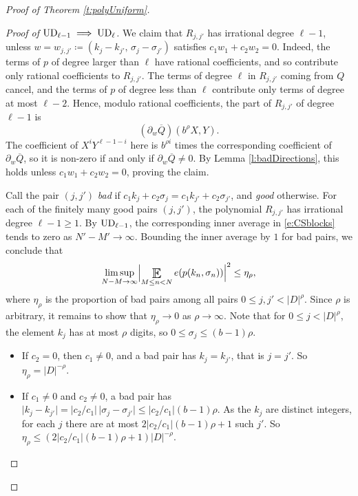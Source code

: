 \begin{proof}[Proof of Theorem \ref{t:polyUniform}]
\begin{proof}[Proof of $\textup{UD}_{\ell-1} \implies \textup{UD}_\ell$]
We claim that $R_{j,j'}$ has irrational degree $\ell-1$, unless $w=w_{j,j'}\coloneqq(k_j-k_{j'},\,\sigma_j-\sigma_{j'})$ satisfies $c_1w_1+c_2w_2=0$. 
Indeed, the terms of $p$ of degree larger than $\ell$ have rational coefficients, and so contribute only rational coefficients to $R_{j,j'}$. 
The terms of degree $\ell$ in $R_{j,j'}$ coming from $Q$ cancel, and the terms of $p$ of degree less than $\ell$ contribute only terms of degree at most $\ell-2$. 
Hence, modulo rational coefficients, the part of $R_{j,j'}$ of degree $\ell-1$ is 
\begin{equation}
(\partial_w\overline Q)(b^{\rho}X,Y). 
\end{equation}
The coefficient of $X^iY^{\ell-1-i}$ here is $b^{\rho i}$ times the corresponding coefficient of $\partial_w\overline Q$, so it is non-zero if and only if $\partial_w\overline Q\neq 0$. 
By Lemma \ref{l:badDirections}, this holds unless $c_1w_1+c_2w_2=0$, proving the claim. 

Call the pair $(j,j')$ \emph{bad} if $c_1k_j+c_2\sigma_j=c_1k_{j'}+c_2\sigma_{j'}$, and \emph{good} otherwise. 
For each of the finitely many good pairs $(j,j')$, the polynomial $R_{j,j'}$ has irrational degree $\ell-1\geq 1$. 
By $\textup{UD}_{\ell-1}$, the corresponding inner average in \eqref{e:CSblocks} tends to zero as $N'-M'\to\infty$. 
Bounding the inner average by $1$ for bad pairs, we conclude that 
\begin{equation}
\limsup_{N-M\to\infty}\Bigl\lvert \Expectation_{M\leq n<N}e(p(k_n,\sigma_n))\Bigr\rvert^2\leq \eta_\rho, 
\end{equation}
where $\eta_\rho$ is the proportion of bad pairs among all pairs $0\leq j,j'<\lvert D\rvert^{\rho}$. 
Since $\rho$ is arbitrary, it remains to show that $\eta_\rho\to0$ as $\rho\to\infty$. 
Note that for $0\leq j<\lvert D\rvert^{\rho}$, the element $k_j$ has at most $\rho$ digits, so $0\leq\sigma_j\leq (b-1)\rho$. 
\begin{itemize}
\item If $c_2=0$, then $c_1\neq0$, and a bad pair has $k_j=k_{j'}$, that is $j=j'$. So $\eta_\rho=\lvert D\rvert^{-\rho}$. 

\item If $c_1\neq0$ and $c_2\neq 0$, a bad pair has $\lvert k_j-k_{j'}\rvert = \lvert c_2/c_1\rvert\,\lvert\sigma_j-\sigma_{j'}\rvert\leq \lvert c_2/c_1\rvert(b-1)\rho$. 
As the $k_j$ are distinct integers, for each $j$ there are at most $2\lvert c_2/c_1\rvert(b-1)\rho+1$ such $j'$. 
So $\eta_\rho\leq (2\lvert c_2/c_1\rvert(b-1)\rho+1)\lvert D\rvert^{-\rho}$. 


\end{itemize}
\end{proof}
\end{proof}
